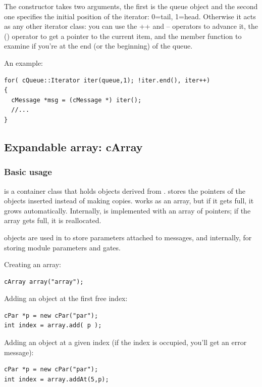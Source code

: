 The  constructor takes two arguments, the first
is the queue object and the second one specifies the initial position
of the iterator: 0=tail, 1=head. Otherwise it acts as any other
{\opp} iterator class: you can use the ++ and -- operators to advance
it, the () operator to get a pointer to the current item, and the
 member function to examine if you're at the end (or the
beginning) of the queue.


An example:

\begin{verbatim}
for( cQueue::Iterator iter(queue,1); !iter.end(), iter++)
{
  cMessage *msg = (cMessage *) iter();
  //...
}
\end{verbatim}




\subsection{Expandable array: cArray}

\subsubsection{Basic usage}


 is a container class that holds objects derived from
.  stores the pointers of the objects
inserted instead of making copies.  works as an array,
but if it gets full, it grows automatically. Internally,
 is implemented with an array of pointers; if the array
gets full, it is reallocated.

 objects are used in {\opp} to store parameters
attached to messages, and internally, for storing module parameters
and gates.


Creating an array:

\begin{verbatim}
cArray array("array");
\end{verbatim}

Adding an object at the first free index:

\begin{verbatim}
cPar *p = new cPar("par");
int index = array.add( p );
\end{verbatim}


Adding an object at a given index (if the index is occupied,
you'll get an error message):

\begin{verbatim}
cPar *p = new cPar("par");
int index = array.addAt(5,p);
\end{verbatim}


